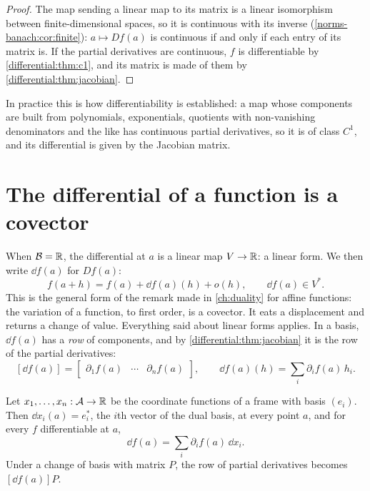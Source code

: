 \begin{notechapter}
\begin{proof}
The map sending a linear map to its matrix is a linear isomorphism between
finite-dimensional spaces, so it is continuous with its inverse
(\cref{norms-banach:cor:finite}): $a\mapsto Df(a)$ is continuous if and
only if each entry of its matrix is. If the partial derivatives are
continuous, $f$ is differentiable by \cref{differential:thm:c1}, and its
matrix is made of them by \cref{differential:thm:jacobian}.
\end{proof}

In practice this is how differentiability is established: a map whose
components are built from polynomials, exponentials, quotients with
non-vanishing denominators and the like has continuous partial
derivatives, so it is of class $C^1$, and its differential is given by
the Jacobian matrix.

\section{The differential of a function is a covector}
\label{differential:sec:covector}

When $\mathcal{B} = \mathbb{R}$, the differential at $a$ is a linear map $V\to\mathbb{R}$: a
linear form. We then write $\dd f(a)$ for $Df(a)$:
\[
  f(a + h) = f(a) + \dd f(a)(h) + o(h), \qquad \dd f(a)\in V^* .
\]
This is the general form of the remark made in \cref{ch:duality} for
affine functions: the variation of a function, to first order, is a
covector. It eats a displacement and returns a change of value. Everything
said about linear forms applies. In a basis, $\dd f(a)$ has a \emph{row}
of components, and by \cref{differential:thm:jacobian} it is the row of
the partial derivatives:
\[
  [\dd f(a)] = \begin{bmatrix}\partial_1f(a) & \cdots & \partial_nf(a)
  \end{bmatrix},
  \qquad
  \dd f(a)(h) = \sum_i\partial_if(a)\,h_i .
\]

\begin{proposition}
\label{differential:prop:components}
Let $x_1,\dots,x_n:\mathcal{A}\to\mathbb{R}$ be the coordinate functions of a frame with
basis $(e_i)$. Then $\dd x_i(a) = e_i^*$, the $i$th vector of the dual
basis, at every point $a$, and for every $f$ differentiable at $a$,
\[
  \dd f(a) = \sum_i\partial_if(a)\,\dd x_i .
\]
Under a change of basis with matrix $P$, the row of partial derivatives
becomes $[\dd f(a)]P$.
\end{proposition}


\end{notechapter}

